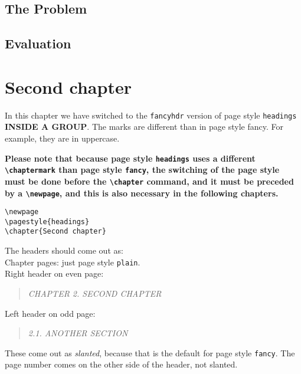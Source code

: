 \documentclass[openany]{book}
\renewcommand{\chaptermark}[1]{\markboth{\thechapter.\ #1}{}}
\renewcommand{\chaptermark}[1]{\markboth{\thechapter.
      \MakeUppercase{##1}}{}}
\renewcommand{\chaptermark}[1]{\markboth{\thechapter.\ ##1}{}}
\begin{document}
\lipsum[1]
\newpage
\section{The Problem}
\label{sec:problem}

\lipsum[2-3]

\section{Evaluation}

\lipsum[3-5]

\lipsum[6]

\newpage
\begingroup
\pagestyle{headings}
\chapter{Second chapter}

\noindent
\begin{boxedminipage}{\textwidth}
In this chapter we have switched to the \texttt{fancyhdr} version of page style \texttt{headings} \textbf{INSIDE A GROUP}. The marks are different than in page style fancy. For example, they are in uppercase.

{\bfseries Please note that because page style \texttt{headings} uses a different \verb|\chaptermark| than page style \texttt{fancy}, the switching of the page style must be done before the \verb|\chapter| command, and it must be preceded by a \verb|\newpage|, and this is also necessary in the following chapters.}
\begin{verbatim}
\newpage
\pagestyle{headings}
\chapter{Second chapter}
\end{verbatim}

The headers should come out as:
\\
Chapter pages: just page style \texttt{plain}.
\\
Right header on even page:
\begin{quote}
  \textsl{CHAPTER 2. SECOND CHAPTER}
\end{quote}
Left header on odd page:
\begin{quote}
  \textsl{2.1. ANOTHER SECTION}
\end{quote}
These come out as \textsl{slanted}, because that is the default for page style \texttt{fancy}.
The page number comes on the other side of the header, not slanted.
\end{boxedminipage}
\bigskip
\end{document}
